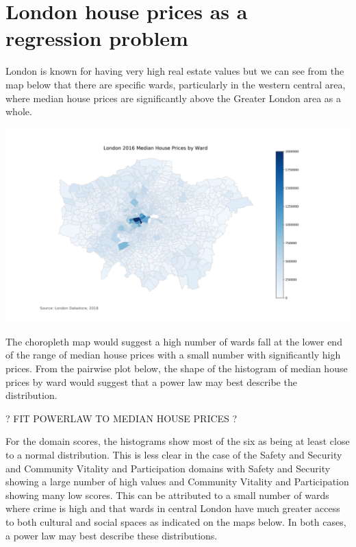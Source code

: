 
\section{London house prices as a regression problem}

London is known for having very high real estate values but we can see from the map below that there are specific wards, particularly in the western central area, where median house prices are significantly above the Greater London area as a whole.

\includegraphics[scale=0.4]{figures/HPMedian} %

The choropleth map would suggest a high number of wards fall at the lower end of the range of median house prices with a small number with significantly high prices. From the pairwise plot below, the shape of the histogram of median house prices by ward would suggest that a power law may best describe the distribution.

? FIT POWERLAW TO MEDIAN HOUSE PRICES ?

For the domain scores, the histograms show most of the six as being at least close to a normal distribution. This is less clear in the case of the Safety and Security and Community Vitality and Participation domains with Safety and Security showing a large number of high values and Community Vitality and Participation showing many low scores. This can be attributed to a small number of wards where crime is high and that wards in central London have much greater access to both cultural and social spaces as indicated on the maps below. In both cases, a power law may best describe these distributions.

